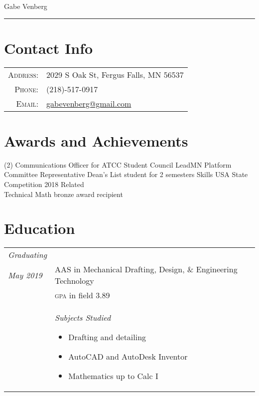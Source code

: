 \documentclass[letterpaper,10pt]{article}
\begin{document}
\pagestyle{empty}%

	\par{\centering
		{\huge Gabe Venberg
	}\bigskip\par}
\hrule
\section*{Contact Info}
	\begin{tabular}{rl}
	\textsc{Address:} & 2029 S Oak St, Fergus Falls, MN 56537\\
	\textsc{Phone:} & (218)-517-0917\\
	\textsc{Email:} & \href{mailto:gabevenberg@gmail.com}{gabevenberg@gmail.com}\\
	\end{tabular}
\section*{Awards and Achievements}
	\begin{tasks}[style=itemize](2)
	\task Communications Officer for ATCC Student Council
	\task LeadMN Platform Committee Representative
	\task Dean's List student for 2 semesters
	\task Skills USA State Competition 2018 Related\\Technical Math bronze award recipient
	\end{tasks}
\section*{Education}
	\begin{tabular}{R{2cm}|p{14cm}}
	\textsl{Graduating}\\
	\textsl{May 2019} & AAS in Mechanical Drafting, Design, \& Engineering Technology\\
	&\textsc{gpa} in field 3.89\\
	&\textsl{Subjects Studied} \begin{itemize}[noitemsep]
	\item Drafting and detailing
	\item AutoCAD and AutoDesk Inventor
	\item Mathematics up to Calc I
	\end{itemize}
	\end{tabular}
\end{document}
